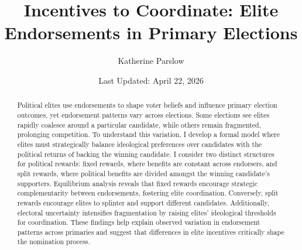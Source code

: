 \documentclass[12pt]{article}
\title{Incentives to Coordinate: Elite Endorsements in Primary Elections}
\author{Katherine Parslow}
\date{Last Updated: April 22, 2026}
\begin{document}
\maketitle

\begin{abstract}
Political elites use endorsements to shape voter beliefs and influence primary election outcomes, yet endorsement patterns vary across elections. Some elections see elites rapidly coalesce around a particular candidate, while others remain fragmented, prolonging competition. To understand this variation, I develop a formal model where elites must strategically balance ideological preferences over candidates with the political returns of backing the winning candidate. I consider two distinct structures for political rewards: fixed rewards, where benefits are constant across endorsers, and split rewards, where political benefits are divided amongst the winning candidate's supporters. Equilibrium analysis reveals that fixed rewards encourage strategic complementarity between endorsements, fostering elite coordination. Conversely, split rewards encourage elites to splinter and support different candidates. Additionally, electoral uncertainty intensifies fragmentation by raising elites' ideological thresholds for coordination. These findings help explain observed variation in endorsement patterns across primaries and suggest that differences in elite incentives critically shape the nomination process.
\end{abstract}






\printbibliography
\end{document}
